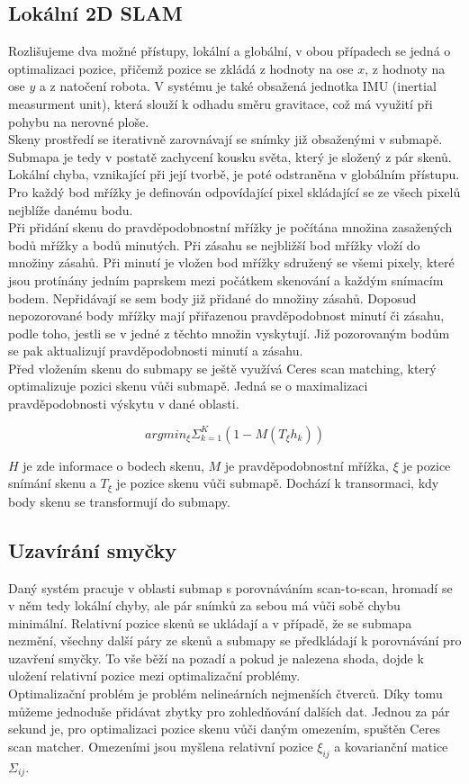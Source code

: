 \documentclass[12pt]{article}
\begin{document}
\subsection{Lokální 2D SLAM}
Rozlišujeme dva možné přístupy, lokální a globální, v obou případech se jedná o optimalizaci pozice, přičemž pozice se zkládá z hodnoty na ose $x$, z hodnoty na ose $y$ a z natočení robota. V systému je také obsažená jednotka IMU (inertial measurment unit), která slouží k odhadu směru gravitace, což má využití při pohybu na nerovné ploše.\\
\indent Skeny prostředí se iterativně zarovnávají se snímky již obsaženými v submapě. Submapa je tedy v postatě zachycení kousku světa, který je složený z pár skenů. Lokální chyba, vznikající při její tvorbě, je poté odstraněna v globálním přístupu. Pro každý bod mřížky je definován odpovídající pixel skládající se ze všech pixelů nejblíže danému bodu.\\
\indent Při přidání skenu do pravděpodobnostní mřížky je počítána množina zasažených bodů mřížky a bodů minutých. Při zásahu se nejbližší bod mřížky vloží do množiny zásahů. Při minutí je vložen bod mřížky sdružený se všemi pixely, které jsou protínány jedním paprskem mezi počátkem skenování a každým snímacím bodem. Nepřidávají se sem body již přidané do množiny zásahů. Doposud nepozorované body mřížky mají přiřazenou pravděpodobnost minutí či zásahu, podle toho, jestli se v jedné z těchto množin vyskytují. Již pozorovaným bodům se pak aktualizují pravděpodobnosti minutí a zásahu.\\
\indent Před vložením skenu do submapy se ještě využívá Ceres scan matching, který optimalizuje pozici skenu vůči submapě. Jedná se o maximalizaci pravděpodobnosti výskytu v dané oblasti.  

\begin{equation}
	argmin_\xi\Sigma^K_{k=1}(1-M(T_{\xi}h_k))
\end{equation}

$H$ je zde informace o bodech skenu, $M$ je pravděpodobnostní mřížka, $\xi$ je pozice snímání skenu a $T_{\xi}$ je pozice skenu vůči submapě. Dochází k transormaci, kdy body skenu se transformují do submapy.

\subsection{Uzavírání smyčky}
Daný systém pracuje v oblasti submap s porovnáváním scan-to-scan, hromadí se v něm tedy lokální chyby, ale pár snímků za sebou má vůči sobě chybu minimální. Relativní pozice skenů se ukládají a v případě, že se submapa nezmění, všechny další páry ze skenů a submapy se předkládají k porovnávání pro uzavření smyčky. To vše běží na pozadí a pokud je nalezena shoda, dojde k uložení relativní pozice mezi optimalizační problémy.\\
\indent Optimalizační problém je problém nelineárních nejmenších čtverců. Díky tomu můžeme jednoduše přidávat zbytky pro zohledňování dalších dat. Jednou za pár sekund je, pro optimalizaci pozice skenu vůči daným omezením, spuštěn Ceres scan matcher. Omezeními jsou myšlena relativní pozice $\xi_{ij}$ a kovarianční matice $\Sigma_{ij}$.
\end{document}
